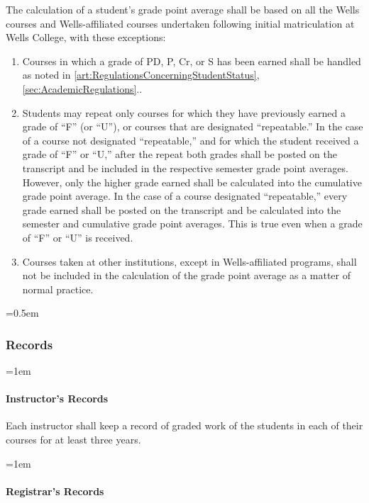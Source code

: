 \documentclass{manual}
\newcommand{\modified}[1]{}
\let\oldsubsubsection\subsubsection
\renewcommand\subsubsection{\leftskip=0.5em\oldsubsubsection}
\let\oldparagraph\paragraph
\renewcommand\paragraph{\leftskip=1em\oldparagraph}
\begin{document}
The calculation of a student's grade point average shall be based on all the Wells courses and Wells-affiliated courses undertaken following  initial matriculation at Wells College, with these exceptions:

\begin{enumerate}[label=\arabic*]
\item Courses in which a grade of PD, P, Cr, or S has been earned shall be handled as noted in \cref{art:RegulationsConcerningStudentStatus}, \cref{sec:AcademicRegulations}..

\item Students may repeat only courses for which they have previously earned a grade\modified{4/8/03}  of ``F'' (or ``U''), or courses that are designated ``repeatable.'' In the case of a course not designated ``repeatable,'' and for which the student received a grade of ``F'' or ``U,'' after the repeat both grades shall be posted on the transcript and be included in the respective semester grade point averages. However, only the higher grade earned shall be calculated into the cumulative grade point average. In the case of a course designated ``repeatable,'' every grade earned shall be posted on the transcript and be calculated into the semester and cumulative grade point averages. This is true even when a grade of ``F'' or ``U'' is received.

\item Courses taken at other institutions, except in Wells-affiliated programs, shall not be included in the calculation of the grade point average as a matter of normal practice.

\end{enumerate}

\subsubsection{Records}

\paragraph{Instructor's Records}

Each instructor shall keep a record of graded work of the students in each of their courses for at least three years.

\paragraph{Registrar's Records}
\end{document}
